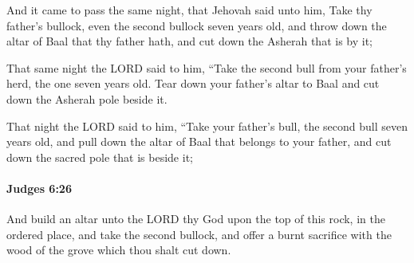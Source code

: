			\begin{versebox}
					\item[BHS] 
					\item[ASV] And it came to pass the same night, that Jehovah said unto him, Take thy father's bullock, even the second bullock seven years old, and throw down the altar of Baal that thy father hath, and cut down the Asherah that is by it;
					\item[NIV] That same night the LORD said to him, “Take the second bull from your father’s herd, the one seven years old. Tear down your father’s altar to Baal and cut down the Asherah pole beside it.
					\item[NRSV] That night the LORD said to him, “Take your father’s bull, the second bull seven years old, and pull down the altar of Baal that belongs to your father, and cut down the sacred pole that is beside it;
			\end{versebox}

		\paragraph{Judges 6:26} %
			\label{JUDGES-6-26}

			And build an altar unto the LORD thy God upon the top of this rock, in the ordered place, and take the second bullock, and offer a burnt sacrifice with the wood of the grove which thou shalt cut down.

